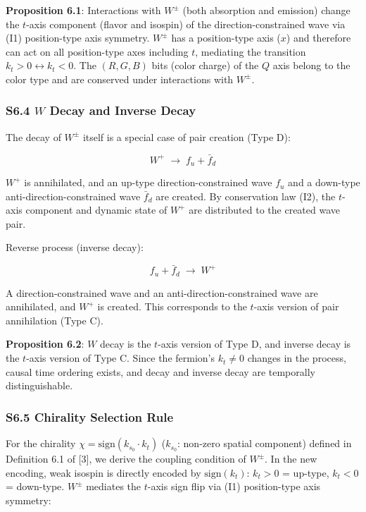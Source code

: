 \documentclass[
  a4paper,11pt]{article}
\theoremstyle{definition}
\theoremstyle{remark}
\begin{document}
\textbf{Proposition 6.1}: Interactions with \(W^{\pm}\) (both absorption
and emission) change the \(t\)-axis component (flavor and isospin) of
the direction-constrained wave via (I1) position-type axis symmetry.
\(W^{\pm}\) has a position-type axis (\(x\)) and therefore can act on
all position-type axes including \(t\), mediating the transition
\(k_t > 0 \leftrightarrow k_t < 0\). The \((R, G, B)\) bits (color
charge) of the \(Q\) axis belong to the color type and are conserved
under interactions with \(W^{\pm}\).

\subsubsection{\texorpdfstring{S6.4 \(W\) Decay and Inverse
Decay}{S6.4 W Decay and Inverse Decay}}\label{s6.4-w-decay-and-inverse-decay}

The decay of \(W^{\pm}\) itself is a special case of pair creation (Type
D):

\[W^+ \;\longrightarrow\; f_u + \bar{f}_d\]

\(W^+\) is annihilated, and an up-type direction-constrained wave
\(f_u\) and a down-type anti-direction-constrained wave \(\bar{f}_d\)
are created. By conservation law (I2), the \(t\)-axis component and
dynamic state of \(W^+\) are distributed to the created wave pair.

Reverse process (inverse decay):

\[f_u + \bar{f}_d \;\longrightarrow\; W^+\]

A direction-constrained wave and an anti-direction-constrained wave are
annihilated, and \(W^+\) is created. This corresponds to the \(t\)-axis
version of pair annihilation (Type C).

\textbf{Proposition 6.2}: \(W\) decay is the \(t\)-axis version of Type
D, and inverse decay is the \(t\)-axis version of Type C. Since the
fermion's \(k_t \neq 0\) changes in the process, causal time ordering
exists, and decay and inverse decay are temporally distinguishable.

\subsubsection{S6.5 Chirality Selection
Rule}\label{s6.5-chirality-selection-rule}

For the chirality \(\chi = \mathrm{sign}(k_{s_0} \cdot k_t)\)
(\(k_{s_0}\): non-zero spatial component) defined in Definition 6.1 of
{[}3{]}, we derive the coupling condition of \(W^{\pm}\). In the new
encoding, weak isospin is directly encoded by \(\mathrm{sign}(k_t)\):
\(k_t > 0\) = up-type, \(k_t < 0\) = down-type. \(W^{\pm}\) mediates the
\(t\)-axis sign flip via (I1) position-type axis symmetry:
\end{document}

